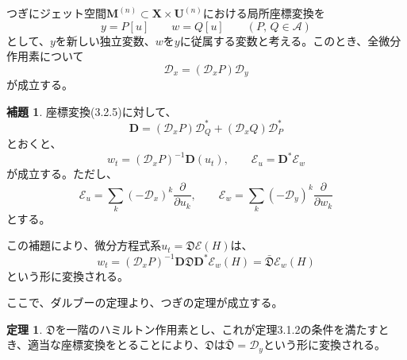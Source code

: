 \documentclass[a4paper, 11pt]{report}
\theoremstyle{definition}
\newtheorem{theorem}{定理}[section]
\newtheorem{lemma}{補題}[section]
\begin{document}
 つぎにジェット空間$\mathbf{M}^{(n)}\subset\mathbf{X}\times\mathbf{U}^{(n)}$における局所座標変換を
\begin{equation}
y = P[u] \qquad w = Q[u] \qquad (P, \, Q\in\mathcal{A})  %
\end{equation}
として、$y$を新しい独立変数、$w$を$y$に従属する変数と考える。このとき、全微分作用素について
\begin{equation*}
\mathcal{D}_x = (\mathcal{D}_xP)\mathcal{D}_y
\end{equation*}
が成立する。

\begin{lemma}
 座標変換(3.2.5)に対して、
\begin{equation*}
\mathbf{D} = (\mathcal{D}_xP)\mathcal{D}_{Q}^*+(\mathcal{D}_xQ)\mathcal{D}_{P}^*
\end{equation*}
とおくと、
\begin{equation*}
w_t = (\mathcal{D}_xP)^{-1}\mathbf{D}(u_t), \qquad \mathcal{E}_u = \mathbf{D}^*\mathcal{E}_w
\end{equation*}
が成立する。ただし、
\begin{equation*}
\mathcal{E}_u = \sum_k(-\mathcal{D}_x)^k\frac{\partial}{\partial u_k}, \qquad \mathcal{E}_w = \sum_k(-\mathcal{D}_y)^k\frac{\partial}{\partial w_k}
\end{equation*}
とする。
\end{lemma}

 この補題により、微分方程式系$u_t=\mathfrak{D}\mathcal{E}(H)$は、
\begin{equation}
w_t = (\mathcal{D}_xP)^{-1}\mathbf{D}\mathfrak{D}\mathbf{D}^*\mathcal{E}_w(H) = \bar{\mathfrak{D}}\mathcal{E}_w(H)  %
\end{equation}
という形に変換される。

 ここで、ダルブーの定理より、つぎの定理が成立する。

\begin{theorem}
 $\mathfrak{D}$を一階のハミルトン作用素とし、これが定理3.1.2の条件を満たすとき、適当な座標変換をとることにより、$\mathfrak{D}$は$\bar{\mathfrak{D}}=\mathcal{D}_y$という形に変換される。
\end{theorem}
\end{document}

